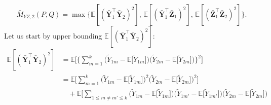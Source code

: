 \documentclass[twoside,11pt]{article}
\newcommand{\rvTwo}{Y}
\newcommand{\rvThree}{Z}
\newcommand{\vectorize}[1]{\mathbf{#1}}
\newcommand{\private}[1]{\tilde{#1}}
\newcommand{\mE}{\mathbb{E}} %
\newcommand{\alphabetSize}{k} %
\newcommand{\vectorIndex}{m}
\newcommand{\kernelMoment}{M} %
\newcommand{\dataGenDist}{P}  %
\newcommand{\privacyMechanism}{Q}
\newcommand{\momentTwosampleExpSquareBar}{\bar{\kernelMoment}_{\rvTwo \rvThree,2}(\dataGenDist, \privacyMechanism)}
\begin{document}
\begin{appendix}
	\begin{equation*}
		\momentTwosampleExpSquareBar
		=
		\max
		\{
		\mE[
		(
		\bar{\vectorize{\rvTwo}}_1^\top 
		\bar{\vectorize{\rvTwo}}_2
		)^2
		], \, 
		\mE[
		(
		\bar{\vectorize{\rvTwo}}_1^\top
		\bar{\vectorize{\rvThree}}_1)^2], \,
		\mE[
		(
		\bar{\vectorize{\rvThree}}_1^\top
		\bar{\vectorize{\rvThree}}_2)^2
		]
		\}.
	\end{equation*}
	Let us start by upper bounding $\mE[
	(
	\bar{\vectorize{\rvTwo}}_1^\top 
	\bar{\vectorize{\rvTwo}}_2
	)^2
	]$:
	\begin{align*}
		\mE[
		(
		\bar{\vectorize{\rvTwo}}_1^\top 
		\bar{\vectorize{\rvTwo}}_2
		)^2
		]
		&=
		\mE
		\biggl[ %
		\biggl\{%
		\sum_{\vectorIndex = 1}^\alphabetSize %
		\bigl( %
		\private{\rvTwo}_{1 \vectorIndex}
		- %
		\mE
		\bigl[
		\private{\rvTwo}_{1 \vectorIndex}
		\bigr]
		\bigr)%
		\bigl( %
		\private{\rvTwo}_{2 \vectorIndex}
		-
		\mE
		\bigl[
		\private{\rvTwo}_{2 \vectorIndex}
		\bigr]
		\bigr)%
		\biggl\}^2 %
		\biggr]
		\\&= %
		\mE
		\biggl[ %
		\sum_{\vectorIndex = 1}^\alphabetSize %
		\bigl( %
		\private{\rvTwo}_{1 \vectorIndex}
		- %
		\mE
		\bigl[
		\private{\rvTwo}_{1 \vectorIndex}
		\bigr]
		\bigr)^2%
		\bigl( %
		\private{\rvTwo}_{2 \vectorIndex}
		-
		\mE
		\bigl[
		\private{\rvTwo}_{2 \vectorIndex}
		\bigr]
		\bigr)^2%
		\biggr]
		\\  & \quad+ %
		\mE
		\biggl[ %
		\sum_{1 \leq \vectorIndex \neq \vectorIndex' \leq \alphabetSize} %
		\bigl( %
		\private{\rvTwo}_{1 \vectorIndex}
		- %
		\mE
		\bigl[
		\private{\rvTwo}_{1 \vectorIndex}
		\bigr]
		\bigr)%
		\bigl( %
		\private{\rvTwo}_{1 \vectorIndex'}
		- %
		\mE
		\bigl[
		\private{\rvTwo}_{1 \vectorIndex'}
		\bigr]
		\bigr)%
		\bigl( %
		\private{\rvTwo}_{2 \vectorIndex}
		-
		\mE
		\bigl[
		\private{\rvTwo}_{2 \vectorIndex}
		\bigr]
		\bigr)%

\end{align*}
\end{appendix}
\end{document}
